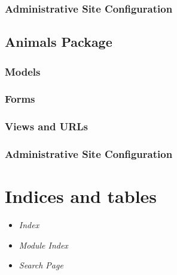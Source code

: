 \documentclass[letterpaper,10pt,english]{sphinxmanual}
\begin{document}
\subsection{Administrative Site Configuration}
\hypertarget{module-data.admin}{}
\modulesynopsis{}

\section{Animals Package}
\hypertarget{module-animal}{}
\modulesynopsis{}

\subsection{Models}
\hypertarget{module-animal.models}{}
\modulesynopsis{}

\subsection{Forms}
\hypertarget{module-animal.forms}{}
\modulesynopsis{}

\subsection{Views and URLs}
\hypertarget{module-animal.views}{}
\modulesynopsis{}
\hypertarget{module-animal.urls}{}
\modulesynopsis{}

\subsection{Administrative Site Configuration}
\hypertarget{module-animal.admin}{}
\modulesynopsis{}

\chapter{Indices and tables}
\begin{itemize}
\item {} 
\emph{Index}

\item {} 
\emph{Module Index}

\item {} 
\emph{Search Page}

\end{itemize}


\renewcommand{\indexname}{Module Index}
\printmodindex
\renewcommand{\indexname}{Index}
\printindex
\end{document}

